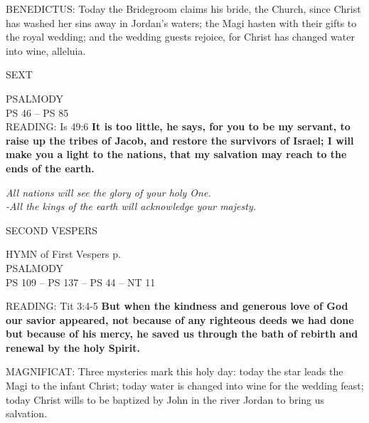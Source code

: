 \noindent\small{\uppercase{BENEDICTUS:}}	Today the Bridegroom claims his bride, the Church, since Christ has washed her sins away in Jordan's waters; the Magi hasten with their gifts to the royal wedding; and the wedding guests rejoice, for Christ has changed water into wine, alleluia.\\

\begin{flushleft}\normalsize{\uppercase{SEXT\\}}\end{flushleft}
\noindent\small{\uppercase{PSALMODY}\\}
\uppercase{Ps 46 -- Ps 85}\vspace{0.5em}\\

\noindent\small{\uppercase{READING:}}    Is 49:6 \textbf{    It is too little, he says, for you to be my servant, to raise up the tribes of Jacob, and restore the survivors of Israel; I will make you a light to the nations, that my salvation may reach to the ends of the earth.}
\begin{center}\textit{All nations will see the glory of your holy One.\\
-All the kings of the earth will acknowledge your majesty.}\end{center}

\begin{flushleft}\normalsize{\uppercase{SECOND VESPERS\\}}\end{flushleft}

\noindent\small{\uppercase{HYMN}} of First Vespers p. \pageref{christmas:epiphany:firstVespers}\\
\noindent\small{\uppercase{PSALMODY}\\}
\uppercase{Ps 109 -- Ps 137 -- Ps 44 -- NT 11}\vspace{0.5em}

\noindent\small{\uppercase{READING:}}    Tit 3:4-5 \textbf{    But when the kindness and generous love of God our savior appeared, not because of any righteous deeds we had done but because of his mercy, he saved us through the bath of rebirth and renewal by the holy Spirit.\\}

\noindent\small{\uppercase{MAGNIFICAT:}}	Three mysteries mark this holy day: today the star leads the Magi to the infant Christ; today water is changed into wine for the wedding feast; today Christ wills to be baptized by John in the river Jordan to bring us salvation.\\
